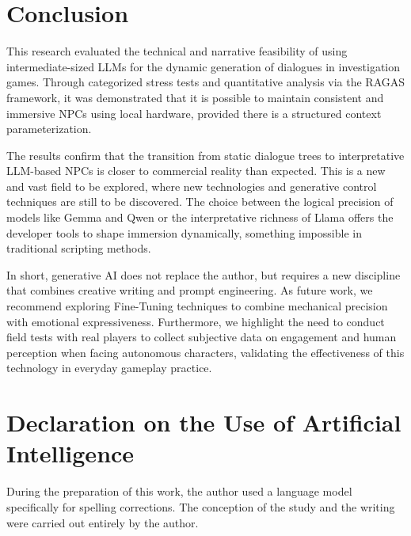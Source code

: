 \documentclass[12pt]{article}
\begin{document}
\section{Conclusion}

This research evaluated the technical and narrative feasibility of using intermediate-sized LLMs for the dynamic generation of dialogues in investigation games. Through categorized stress tests and quantitative analysis via the RAGAS framework, it was demonstrated that it is possible to maintain consistent and immersive NPCs using local hardware, provided there is a structured context parameterization.

The results confirm that the transition from static dialogue trees to interpretative LLM-based NPCs is closer to commercial reality than expected. This is a new and vast field to be explored, where new technologies and generative control techniques are still to be discovered. The choice between the logical precision of models like Gemma and Qwen or the interpretative richness of Llama offers the developer tools to shape immersion dynamically, something impossible in traditional scripting methods.

In short, generative AI does not replace the author, but requires a new discipline that combines creative writing and prompt engineering. As future work, we recommend exploring Fine-Tuning techniques to combine mechanical precision with emotional expressiveness. Furthermore, we highlight the need to conduct field tests with real players to collect subjective data on engagement and human perception when facing autonomous characters, validating the effectiveness of this technology in everyday gameplay practice.

\section*{Declaration on the Use of Artificial Intelligence}

During the preparation of this work, the author used a language model specifically for spelling corrections. The conception of the study and the writing were carried out entirely by the author.



\end{document}
